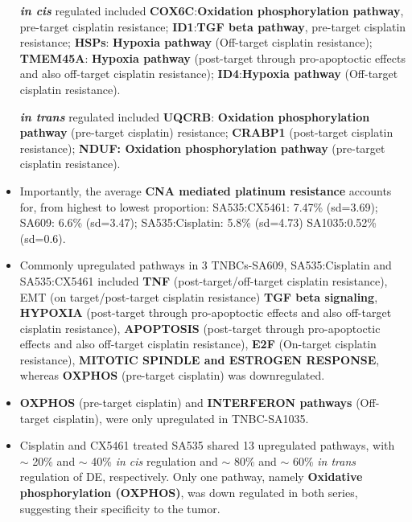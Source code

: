 \begin{itemize}
 \textbf{\textit{in cis}} regulated included \textbf{COX6C}:\textbf{Oxidation phosphorylation pathway}, pre-target cisplatin resistance; \textbf{ID1}:\textbf{TGF beta pathway}, pre-target cisplatin resistance; \textbf{HSPs}: \textbf{Hypoxia pathway} (Off-target cisplatin resistance);  \textbf{TMEM45A}: \textbf{Hypoxia pathway} (post-target through pro-apoptoctic effects and also off-target cisplatin resistance); \textbf{ID4}:\textbf{Hypoxia pathway} (Off-target cisplatin resistance).  

   \textbf{\textit{in trans}} regulated included  \textbf{UQCRB}: \textbf{Oxidation phosphorylation pathway} (pre-target cisplatin) resistance;  \textbf{CRABP1} (post-target cisplatin resistance); \textbf{NDUF: Oxidation phosphorylation pathway} (pre-target cisplatin resistance). 

 \item Importantly, the average \textbf{CNA mediated platinum resistance} accounts for, from highest to lowest proportion: SA535:CX5461: 7.47\% (sd=3.69); 
SA609: 6.6\% (sd=3.47); SA535:Cisplatin: 5.8\% (sd=4.73)
SA1035:0.52\% (sd=0.6). 
 
  \item Commonly upregulated pathways in 3 TNBCs-SA609, SA535:Cisplatin and SA535:CX5461 included \textbf{TNF} (post-target/off-target cisplatin resistance), EMT (on target/post-target cisplatin resistance) \textbf{TGF  beta  signaling},  \textbf{HYPOXIA} (post-target through pro-apoptoctic effects and also off-target cisplatin resistance), \textbf{APOPTOSIS} (post-target through pro-apoptoctic effects and also off-target cisplatin resistance), \textbf{E2F} (On-target cisplatin resistance), \textbf{MITOTIC SPINDLE and ESTROGEN  RESPONSE}, whereas \textbf{OXPHOS} (pre-target cisplatin) was downregulated. 
 
 \item \textbf{OXPHOS} (pre-target cisplatin) and \textbf{INTERFERON pathways} (Off-target cisplatin), were only upregulated in TNBC-SA1035.
 
 \item Cisplatin and CX5461 treated SA535 shared 13 upregulated pathways, with $\sim$ 20\% and $\sim$ 40\% \textit{in cis} regulation and $\sim$ 80\% and $\sim$ 60\% \textit{in trans} regulation of DE, respectively. Only one pathway, namely \textbf{Oxidative phosphorylation (OXPHOS)}, was down regulated in both series, suggesting their specificity to the tumor.

\end{itemize}

